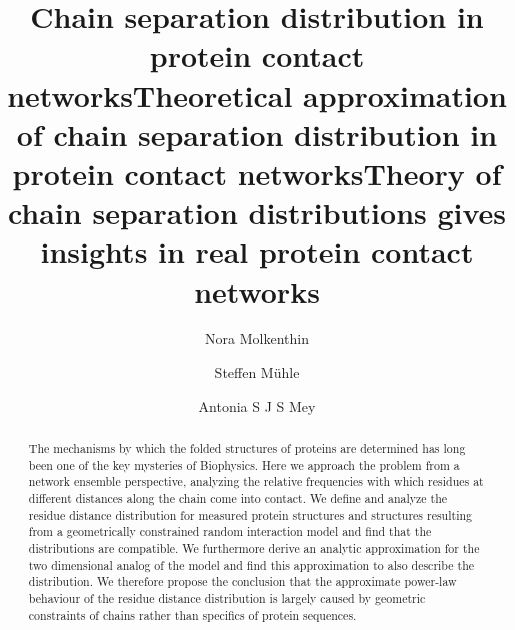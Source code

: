 \documentclass[
reprint,
twocolumn,
amsmath,amssymb,superscriptaddress,aps,
pre]{revtex4-1}
\begin{document}
\title{Chain separation distribution in protein contact networks}
\title{Theoretical approximation of chain separation distribution in protein contact networks}
\title{Theory of chain separation distributions gives insights in real protein contact networks}
\author{Nora Molkenthin}
\author{Steffen Mühle}
\author{Antonia S J S Mey}

\begin{abstract}
The mechanisms by which the folded structures of proteins are determined has long been one of the key mysteries of Biophysics. Here we approach the problem from a network ensemble perspective, analyzing the relative frequencies with which residues at different distances along the chain come into contact. We define and analyze the residue distance distribution for measured protein structures and structures resulting from a geometrically constrained random interaction model and find that the distributions are compatible. We furthermore derive an analytic approximation for the two dimensional analog of the model and find this approximation to also describe the distribution. We therefore propose the conclusion that the approximate power-law behaviour of the residue distance distribution is largely caused by geometric constraints of chains rather than specifics of protein sequences.
\end{abstract}
\maketitle
\end{document}
